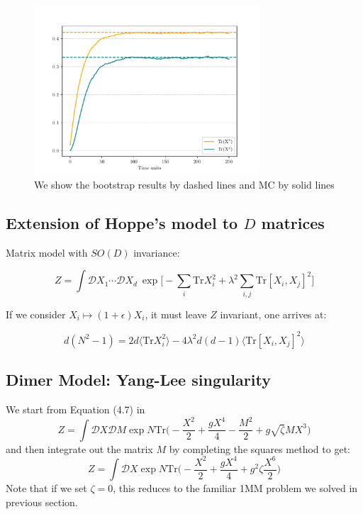 \documentclass[11pt]{article}
\begin{document}
\begin{figure}[htbp] 
	\centering 
	\includegraphics[width=0.75\textwidth]{figs/plot_2MM.pdf}
	\caption{\label{fig:2MM_match} We show the bootstrap results by dashed lines and MC by solid lines}
\end{figure}

\subsection{Extension of Hoppe's model to $D$ matrices}

Matrix model with $SO(D)$ invariance:

\begin{equation}
	Z = \int \mathcal{D}X_1 \cdots \mathcal{D}X_d ~
	\exp\Big[ -\sum_{i} \mbox{Tr} X_{i}^{2} + \lambda^2 \sum_{i,j} \mbox{Tr} [X_i,X_j]^{2}\Big]
\end{equation}

If we consider $X_i \mapsto (1+\epsilon) X_i$, it must leave $Z$ invariant, one arrives at:

\begin{equation}
	d(N^2 -1) = 2d \langle \mbox{Tr}X_{i}^{2} \rangle 
	-4 \lambda^2 d(d-1) \langle \mbox{Tr}[X_i,X_j]^{2} \rangle
\end{equation}

\subsection{Dimer Model: Yang-Lee singularity}

We start from Equation (4.7) in \cite{Staudacher:1989fy} 
\begin{equation}
	\label{eq:Stau0}
	Z = \int \mathcal{D}X \mathcal{D}M \exp N \mbox{Tr}\Bigg(-\frac{X^2}{2} + \frac{gX^4}{4} - \frac{M^2}{2} + g \sqrt{\zeta} MX^3 \Bigg)
\end{equation}
and then integrate out the matrix $M$ by completing the squares method to get:
\begin{equation}
	\label{eq:Stau1} 
	Z = \int \mathcal{D}X \exp N \mbox{Tr}\Bigg(-\frac{X^2}{2} + \frac{gX^4}{4} + g^2 \zeta  \frac{X^6}{2}   \Bigg)
\end{equation}
Note that if we set $\zeta=0$, this reduces to the familiar 1MM problem we solved in previous section. 
\end{document}
